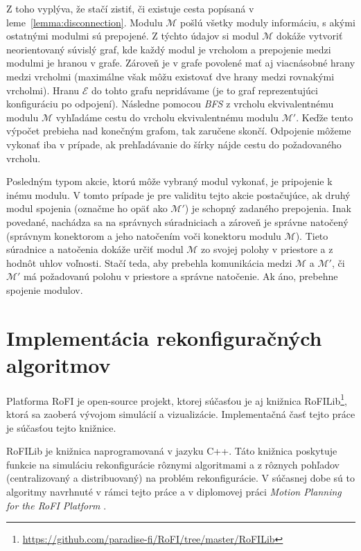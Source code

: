 \documentclass[
  printed, %
  oneside, %
  notable,   %
  nolof,     %
  nolot,     %
]{fithesis3}
\begin{document}
Z toho vyplýva, že stačí zistiť, či existuje cesta popísaná v leme~\ref{lemma:disconnection}. Modulu $\mathcal{M}$ pošlú všetky moduly informáciu, s akými ostatnými modulmi sú prepojené. Z týchto údajov si modul $\mathcal{M}$ dokáže vytvoriť neorientovaný súvislý graf, kde každý modul je vrcholom a prepojenie medzi modulmi je hranou v grafe. Zároveň je v grafe povolené mať aj viacnásobné hrany medzi vrcholmi (maximálne však môžu existovať dve hrany medzi rovnakými vrcholmi). Hranu $\mathcal{E}$ do tohto grafu nepridávame (je to graf reprezentujúci konfiguráciu po odpojení). Následne pomocou \textit{BFS} z vrcholu ekvivalentnému modulu $\mathcal{M}$ vyhľadáme cestu do vrcholu ekvivalentnému modulu $\mathcal{M}'$. Keďže tento výpočet prebieha nad konečným grafom, tak zaručene skončí. Odpojenie môžeme vykonať iba v prípade, ak prehľadávanie do šírky nájde cestu do požadovaného vrcholu. 

Posledným typom akcie, ktorú môže vybraný modul vykonať, je pripojenie k inému modulu. V tomto prípade je pre validitu tejto akcie postačujúce, ak druhý modul spojenia (označme ho opäť ako $\mathcal{M}'$) je schopný zadaného prepojenia. Inak povedané, nachádza sa na správnych súradniciach a zároveň je správne natočený (správnym konektorom a jeho natočením voči konektoru modulu $\mathcal{M}$). Tieto súradnice a natočenia dokáže určiť modul $\mathcal{M}$ zo svojej polohy v priestore a z hodnôt uhlov voľnosti. Stačí teda, aby prebehla komunikácia medzi $\mathcal{M}$ a $\mathcal{M}'$, či $\mathcal{M}'$ má požadovanú polohu v priestore a správne natočenie. Ak áno, prebehne spojenie modulov. 





\chapter{Implementácia rekonfiguračných algoritmov}
\label{sec:implementation}
Platforma RoFI je open-source projekt, ktorej súčasťou je aj knižnica RoFILib\footnote{\url{https://github.com/paradise-fi/RoFI/tree/master/RoFILib}}, ktorá sa zaoberá vývojom simulácií a vizualizácie. Implementačná časť tejto práce je súčasťou tejto knižnice. 

RoFILib je knižnica naprogramovaná v jazyku C++. Táto knižnica poskytuje funkcie na simuláciu rekonfigurácie rôznymi algoritmami a z rôznych pohľadov (centralizovaný a distribuovaný) na problém rekonfigurácie. V súčasnej dobe sú to algoritmy navrhnuté v rámci tejto práce a v diplomovej práci \textit{Motion Planning for the RoFI Platform} \cite{vozarovaMasterThesis}.
\end{document}
